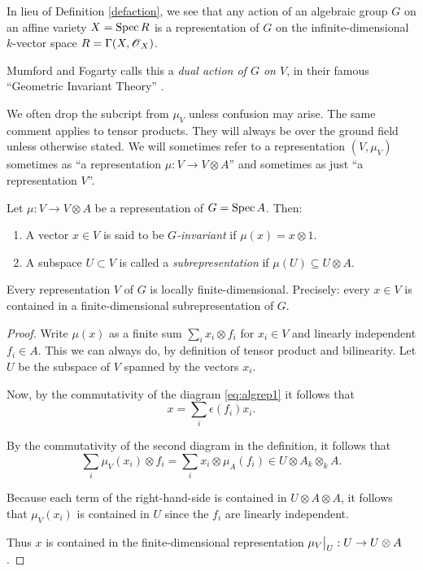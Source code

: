 \documentclass[11pt, english]{article}
\begin{document}
\begin{remark}
In lieu of Definition \ref{defaction}, we see that any action of an algebraic group $G$ on an affine variety $X=\operatorname{Spec} R$ is a representation of $G$ on the infinite-dimensional $k$-vector space $R=\Gamma(X,\operatorname{\mathscr{O}}_X)$.
\end{remark}

\begin{remark}
Mumford and Fogarty calls this a \emph{dual action of $G$ on $V$}, in their famous ``Geometric Invariant Theory'' \cite{mumford_git}.
\end{remark}

We often drop the subcript from $\mu_V$ unless confusion may arise. The same comment applies to tensor products. They will always be over the ground field unless otherwise stated. We will sometimes refer to a representation $(V,\mu_V)$ sometimes as ``a representation $\mu:V \to V \otimes A$'' and sometimes as just ``a representation $V$''.

\begin{defi}
Let $\mu:V \to V \otimes A$ be a representation of $G = \operatorname{Spec} A$. Then:
\begin{enumerate}
\item A vector $x \in V$ is said to be \emph{$G$-invariant} if $\mu(x) = x \otimes 1$.
\item A subspace $U \subset V$ is called a \emph{subrepresentation} if $\mu(U) \subseteq U \otimes A$. 
\end{enumerate}
\end{defi}

\begin{prop}
\label{propfinite}
Every representation $V$ of $G$ is locally finite-dimensional. Precisely: every $x \in V$ is contained in a finite-dimensional subrepresentation of $G$.
\end{prop}

\begin{proof}
Write $\mu(x)$ as a finite sum $\sum_i x_i \otimes f_i$ for $x_i \in V$ and linearly independent $f_i \in A$. This we can always do, by definition of tensor product and bilinearity. Let $U$ be the subspace of $V$ spanned by the vectors $x_i$. 

Now, by the commutativity of the diagram \eqref{eq:algrep1} it follows that $$ x = \sum_i \epsilon(f_i) x_i. $$

By the commutativity of the second diagram in the definition, it follows that
$$
\sum_i \mu_V (x_i) \otimes f_i = \sum_i x_i \otimes \mu_A(f_i) \in U \otimes A_k \otimes_k A.
$$

Because each term of the right-hand-side is contained in $U \otimes A \otimes A$, it follows that $\mu_V(x_i)$ is contained in $U$ since the $f_i$ are linearly independent.

Thus $x$ is contained in the finite-dimensional representation $\restr{\mu_V}{U}:U \to U \otimes A$.
\end{proof}
\end{document}
